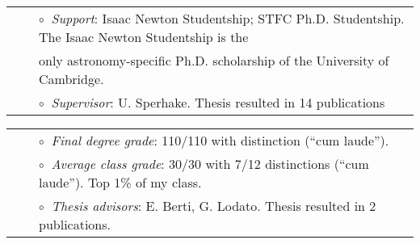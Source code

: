 \documentclass[a4paper]{moderncv}
\begin{document}
\vspace{-0.1cm}
\begin{tabular}{rcl}
&\hspace{0.4cm} &$\circ\;\;${\textit{Support}}: Isaac Newton Studentship; STFC Ph.D. Studentship. The
Isaac Newton Studentship is the \\&\hspace{0.4cm} &  
\hspace{0.4cm}only astronomy-specific Ph.D. scholarship of the University of Cambridge.\\
&\hspace{0.4cm} &$\circ\;\;${\textit{Supervisor}}: U. Sperhake. Thesis resulted in 14 publications \\
\end{tabular}

\vspace{0.2cm}
\vspace{-0.1cm}
\begin{tabular}{rcl}
&\hspace{0.4cm} &$\circ\;\;${\textit{Final degree grade}}: 110/110 with distinction (``cum laude'').\\
&\hspace{0.4cm} &$\circ\;\;${\textit{Average class grade}}: 30/30 with 7/12 distinctions (``cum laude''). Top 1\% of my class.\\
&\hspace{0.4cm} &$\circ\;\;${\textit{Thesis advisors}}: E. Berti, G. Lodato. Thesis resulted in 2 publications.\\


\end{tabular}
\end{document}
